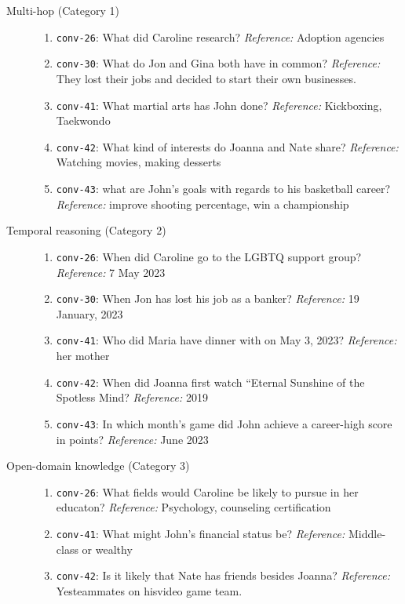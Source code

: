 \begin{description}
  \item[Multi-hop (Category 1)]
  \begin{enumerate}
    \item \texttt{conv-26}: What did Caroline research? \emph{Reference:} Adoption agencies
    \item \texttt{conv-30}: What do Jon and Gina both have in common? \emph{Reference:} They lost their jobs and decided to start their own businesses.
    \item \texttt{conv-41}: What martial arts has John done? \emph{Reference:} Kickboxing, Taekwondo
    \item \texttt{conv-42}: What kind of interests do Joanna and Nate share? \emph{Reference:} Watching movies, making desserts
    \item \texttt{conv-43}: what are John's goals with regards to his basketball career? \emph{Reference:} improve shooting percentage, win a championship
  \end{enumerate}
  \item[Temporal reasoning (Category 2)]
  \begin{enumerate}
    \item \texttt{conv-26}: When did Caroline go to the LGBTQ support group? \emph{Reference:} 7 May 2023
    \item \texttt{conv-30}: When Jon has lost his job as a banker? \emph{Reference:} 19 January, 2023
    \item \texttt{conv-41}: Who did Maria have dinner with on May 3, 2023? \emph{Reference:} her mother
    \item \texttt{conv-42}: When did Joanna first watch ``Eternal Sunshine of the Spotless Mind? \emph{Reference:} 2019
    \item \texttt{conv-43}: In which month's game did John achieve a career-high score in points? \emph{Reference:} June 2023
  \end{enumerate}
  \item[Open-domain knowledge (Category 3)]
  \begin{enumerate}
    \item \texttt{conv-26}: What fields would Caroline be likely to pursue in her educaton? \emph{Reference:} Psychology, counseling certification
    \item \texttt{conv-41}: What might John's financial status be? \emph{Reference:} Middle-class or wealthy
    \item \texttt{conv-42}: Is it likely that Nate has friends besides Joanna? \emph{Reference:} Yesteammates on hisvideo game team.

\end{enumerate}
\end{description}
